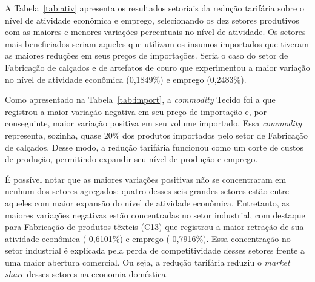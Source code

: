 A Tabela~\ref{tab:ativ} apresenta os resultados setoriais da redução tarifária sobre o nível de atividade econômica e emprego, selecionando os dez setores produtivos com as maiores e menores variações percentuais no nível de atividade. Os setores mais beneficiados seriam aqueles que utilizam os insumos importados que tiveram as maiores reduções em seus preços de importações. Seria o caso do setor de Fabricação de calçados e de artefatos de couro que experimentou a maior variação no nível de atividade econômica (0,1849\%) e emprego (0,2483\%).

Como apresentado na Tabela~\ref{tab:import}, a \textit{commodity} Tecido foi a que registrou a maior variação negativa em seu preço de importação e, por conseguinte, maior variação positiva em seu volume importado. Essa \textit{commodity} representa, sozinha, quase 20\% dos produtos importados pelo setor de Fabricação de calçados. Desse modo, a redução tarifária funcionou como um corte de custos de produção, permitindo expandir seu nível de produção e emprego.

É possível notar que as maiores variações positivas não se concentraram em nenhum dos setores agregados: quatro desses seis grandes setores estão entre aqueles com maior expansão do nível de atividade econômica. Entretanto, as maiores variações negativas estão concentradas no setor industrial, com destaque para Fabricação de produtos têxteis (C13) que registrou a maior retração de sua atividade econômica (-0,6101\%) e emprego (-0,7916\%). Essa concentração no setor industrial é explicada pela perda de competitividade desses setores frente a uma maior abertura comercial. Ou seja, a redução tarifária reduziu o \textit{market share} desses setores na economia doméstica.


